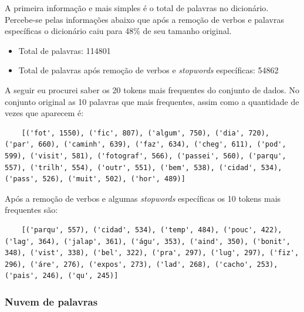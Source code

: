 A primeira informação e mais simples é o total de palavras no dicionário. Percebe-se pelas informações abaixo que após a remoção de verbos 
e palavras específicas o dicionário caiu para 48\% de seu tamanho original.

\begin{itemize}
    \item Total de palavras: 114801
    \item Total de palavras após remoção de verbos e \textit{stopwords} específicas: 54862
\end{itemize}

A seguir eu procurei saber os 20 tokens mais frequentes do conjunto de dados. No conjunto original as 10 palavras que mais frequentes, 
assim como a quantidade de vezes que aparecem é:

\begin{lstlisting}
    [('fot', 1550), ('fic', 807), ('algum', 750), ('dia', 720), ('par', 660), ('caminh', 639), ('faz', 634), ('cheg', 611), ('pod', 599), ('visit', 581), ('fotograf', 566), ('passei', 560), ('parqu', 557), ('trilh', 554), ('outr', 551), ('bem', 538), ('cidad', 534), ('pass', 526), ('muit', 502), ('hor', 489)]
\end{lstlisting}

Após a remoção de verbos e algumas \textit{stopwords} específicas os 10 tokens mais frequentes são:

\begin{lstlisting}
    [('parqu', 557), ('cidad', 534), ('temp', 484), ('pouc', 422), ('lag', 364), ('jalap', 361), ('águ', 353), ('aind', 350), ('bonit', 348), ('vist', 338), ('bel', 322), ('pra', 297), ('lug', 297), ('fiz', 296), ('áre', 276), ('expos', 273), ('lad', 268), ('cacho', 253), ('pais', 246), ('qu', 245)]
\end{lstlisting}

\subsubsection{Nuvem de palavras}